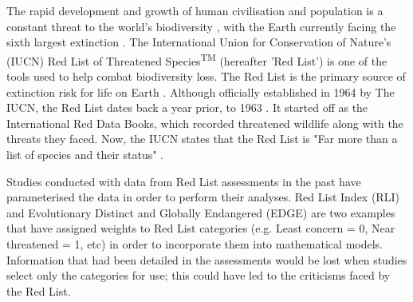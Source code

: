 The rapid development and growth of human civilisation and population is a constant threat to the world's biodiversity \parencite{joppa2016impact,cardinale2012biodiversity,hoffmann2010impact,duraiappah2005ecosystems, sala2000global}, with the Earth currently facing the sixth largest extinction \parencite{tilman2017future, barnosky2011has}. The International Union for Conservation of Nature's (IUCN) Red List of Threatened Species\textsuperscript{TM} (hereafter 'Red List') is one of the tools used to help combat biodiversity loss. The Red List is the primary source of extinction risk for life on Earth \parencite{iucn2021, rodrigues2006value, lamoreux2003value}. Although officially established in 1964 by The IUCN, the Red List dates back a year prior, to 1963 \parencite{scott1987red}. It started off as the International Red Data Books, which recorded threatened wildlife along with the threats they faced. Now, the IUCN states that the Red List is "Far more than a list of species and their status" \parencite{iucn2021}. 

Studies conducted with data from Red List assessments in the past have parameterised the data in order to perform their analyses. Red List Index (RLI) \parencite{iucn2009} and Evolutionary Distinct and Globally Endangered (EDGE) \parencite{isaac2007mammals} are two examples that have assigned weights to Red List categories (e.g. Least concern = 0, Near threatened = 1, etc) in order to incorporate them into mathematical models. Information that had been detailed in the assessments would be lost when studies select only the categories for use; this could have led to the criticisms faced by the Red List.

